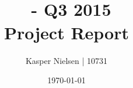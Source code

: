 \documentclass[11pt]{article}
\title{
	{\Huge \projectTitle \\}
	\bigskip
	\courseCode\ - Q3 2015 \\
	\medskip
	Project Report
	}
\author{Kasper Nielsen | 10731}
\date{\today} %
\begin{document}
\maketitle	%

\listoffixmes %

\newpage			%
\tableofcontents	%

\newpage


\newpage
	

\newpage
	

\newpage


\newpage
 

\newpage



\newpage
\appendix


% 
\end{document}

